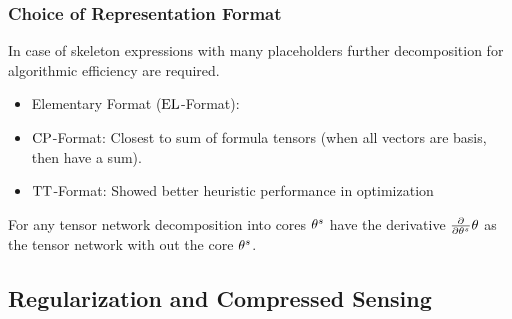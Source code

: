 \subsubsection{Choice of Representation Format}



In case of skeleton expressions with many placeholders further decomposition for algorithmic efficiency are required.
\begin{itemize}
	\item Elementary Format ($\mathrm{EL}$-Format): 
	\item $\mathrm{CP}$-Format: Closest to sum of formula tensors (when all vectors are basis, then have a sum).
	\item $\mathrm{TT}$-Format: Showed better heuristic performance in optimization
\end{itemize}

For any tensor network decomposition into cores $\theta^{s}$ have the derivative $\frac{\partial}{\partial \theta^{s}} \theta$ as the tensor network with out the core $\theta^{s}$.





\subsection{Regularization and Compressed Sensing}


